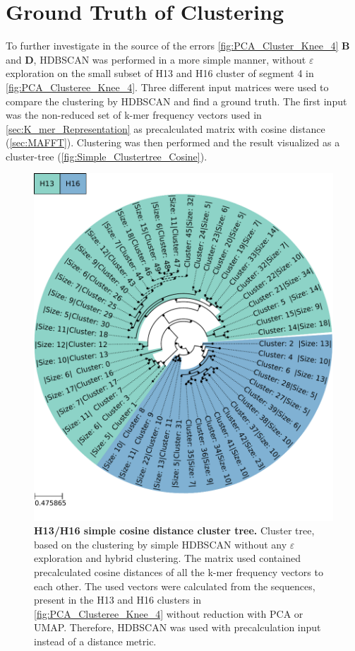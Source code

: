 \section{Ground Truth of Clustering} \label{sec:Comparison_Clustering}

To further investigate in the source of the errors \autoref{fig:PCA_Cluster_Knee_4} \textbf{\textsf{B}} and \textbf{\textsf{D}}, \gls{HDBSCAN} was performed in a more simple manner, without $\varepsilon$ exploration on the small subset of H13 and H16 cluster of segment 4 in \autoref{fig:PCA_Clusteree_Knee_4}. Three different input matrices were used to compare the clustering by \gls{HDBSCAN} and find a ground truth. The first input was the non-reduced set of k-mer frequency vectors used in \autoref{sec:K_mer_Representation} as precalculated matrix with cosine distance (\autoref{sec:MAFFT}). Clustering was then performed and the result visualized as a cluster-tree (\autoref{fig:Simple_Clustertree_Cosine}). 

\begin{figure}[!hbt]
    \centering
    \includegraphics[width=\textwidth]{PCA/Clustertree_Segment_4_H_Cosine.pdf}
    \caption[H13/H16 simple precalculated cosine distance cluster tree]{\textbf{H13/H16 simple cosine distance cluster tree.} Cluster tree, based on the clustering by simple \gls{HDBSCAN} without any $\varepsilon$ exploration and hybrid clustering. The matrix used contained precalculated cosine distances of all the k-mer frequency vectors to each other. The used vectors were calculated from the sequences, present in the H13 and H16 clusters in \autoref{fig:PCA_Clusteree_Knee_4} without reduction with \gls{PCA} or \gls{UMAP}. Therefore, \gls{HDBSCAN} was used with precalculation input instead of a distance metric.}
    \label{fig:Simple_Clustertree_Cosine}
\end{figure}

